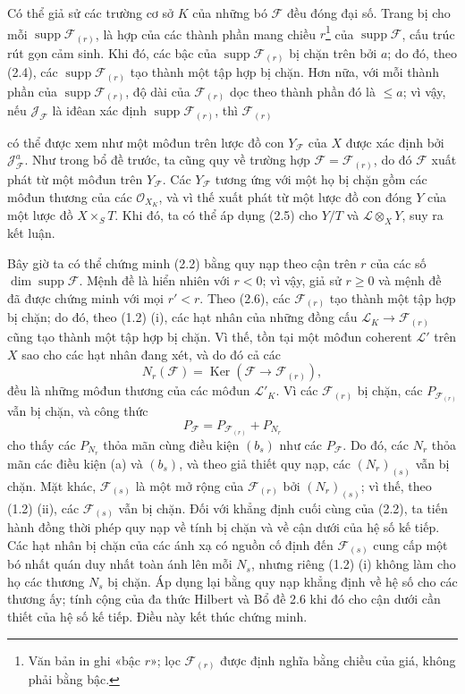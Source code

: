 \documentclass[11pt,twoside,openany]{book}
\numberwithin{equation}{section}
\newcommand{\src}[1]{%
  \phantomsection\hypertarget{src:\fgasourceid:#1}{}%
  \marginpar{\raggedleft\footnotesize\sffamily #1}%
}
\newcommand{\fgasourceid}{unset}
\begin{document}
Có thể giả sử các trường cơ sở $K$ của những bó $\mathcal F$ đều đóng đại số.
Trang bị cho mỗi $\operatorname{supp}\mathcal F_{(r)}$, là hợp của các thành
phần mang chiều $r$\footnote{Văn bản in ghi «bậc $r$»; lọc
$\mathcal F_{(r)}$ được định nghĩa bằng chiều của giá, không phải bằng bậc.}
của $\operatorname{supp}\mathcal F$, cấu trúc rút gọn cảm sinh. Khi đó, các
bậc của $\operatorname{supp}\mathcal F_{(r)}$ bị chặn trên bởi $a$; do đó,
theo (2.4), các $\operatorname{supp}\mathcal F_{(r)}$ tạo thành một tập hợp bị
chặn. Hơn nữa, với mỗi thành phần của
$\operatorname{supp}\mathcal F_{(r)}$, độ dài của $\mathcal F_{(r)}$ dọc theo
thành phần đó là $\leq a$; vì vậy, nếu $\mathcal J_{\mathcal F}$ là iđêan xác
định $\operatorname{supp}\mathcal F_{(r)}$, thì $\mathcal F_{(r)}$
\src{258}
có thể được xem như một môđun trên lược đồ con $Y_{\mathcal F}$ của $X$ được
xác định bởi $\mathcal J_{\mathcal F}^{a}$. Như trong bổ đề trước, ta cũng quy
về trường hợp $\mathcal F=\mathcal F_{(r)}$, do đó $\mathcal F$ xuất phát từ
một môđun trên $Y_{\mathcal F}$. Các $Y_{\mathcal F}$ tương ứng với một họ bị
chặn gồm các môđun thương của các $\mathcal O_{X_K}$, và vì thế xuất phát từ
một lược đồ con đóng $Y$ của một lược đồ $X\times_S T$. Khi đó, ta có thể áp
dụng (2.5) cho $Y/T$ và $\mathcal L\otimes_XY$, suy ra kết luận.

Bây giờ ta có thể chứng minh (2.2) bằng quy nạp theo cận trên $r$ của các số
$\dim\operatorname{supp}\mathcal F$. Mệnh đề là hiển nhiên với $r<0$; vì vậy,
giả sử $r\geq0$ và mệnh đề đã được chứng minh với mọi $r'<r$. Theo (2.6), các
$\mathcal F_{(r)}$ tạo thành một tập hợp bị chặn; do đó, theo (1.2) (i), các
hạt nhân của những đồng cấu
$\mathcal L_K\longrightarrow\mathcal F_{(r)}$ cũng tạo thành một tập hợp bị
chặn. Vì thế, tồn tại một môđun coherent $\mathcal L'$ trên $X$ sao cho các hạt
nhân đang xét, và do đó cả các
\[
N_r(\mathcal F)=\operatorname{Ker}(\mathcal F\longrightarrow\mathcal F_{(r)}),
\]
đều là những môđun thương của các môđun $\mathcal L'_K$. Vì các
$\mathcal F_{(r)}$ bị chặn, các $P_{\mathcal F_{(r)}}$ vẫn bị chặn, và công
thức
\[
P_{\mathcal F}=P_{\mathcal F_{(r)}}+P_{N_r}
\]
cho thấy các $P_{N_r}$ thỏa mãn cùng điều kiện $(b_s)$ như các
$P_{\mathcal F}$. Do đó, các $N_r$ thỏa mãn các điều kiện (a) và $(b_s)$, và
theo giả thiết quy nạp, các $(N_r)_{(s)}$ vẫn bị chặn. Mặt khác,
$\mathcal F_{(s)}$ là một mở rộng của $\mathcal F_{(r)}$ bởi
$(N_r)_{(s)}$; vì thế, theo (1.2) (ii), các $\mathcal F_{(s)}$ vẫn bị chặn.
Đối với khẳng định cuối cùng của (2.2), ta tiến hành đồng thời phép quy nạp về tính bị chặn và về cận dưới của hệ số kế tiếp. Các hạt nhân bị chặn của các ánh xạ có nguồn cố định đến $\mathcal F_{(s)}$ cung cấp một bó nhất quán duy nhất toàn ánh lên mỗi $N_s$, nhưng riêng (1.2) (i) không làm cho họ các thương $N_s$ bị chặn. Áp dụng lại bằng quy nạp khẳng định về hệ số cho các thương ấy; tính cộng của đa thức Hilbert và Bổ đề 2.6 khi đó cho cận dưới cần thiết của hệ số kế tiếp. Điều này kết thúc chứng
minh.
\end{document}
